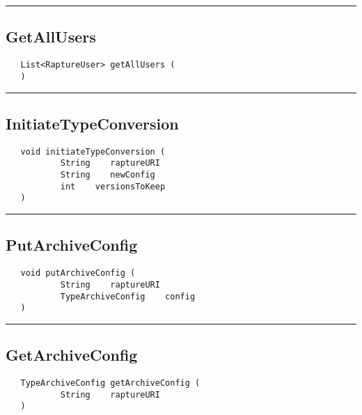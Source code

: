 \rule{15cm}{2pt}
\subsection{GetAllUsers}
\label{Api:GetAllUsers}
\begin{verbatim}
   List<RaptureUser> getAllUsers (
   )
\end{verbatim}



\rule{15cm}{2pt}
\subsection{InitiateTypeConversion}
\label{Api:InitiateTypeConversion}
\begin{verbatim}
   void initiateTypeConversion (
           String    raptureURI
           String    newConfig
           int    versionsToKeep
   )
\end{verbatim}



\rule{15cm}{2pt}
\subsection{PutArchiveConfig}
\label{Api:PutArchiveConfig}
\begin{verbatim}
   void putArchiveConfig (
           String    raptureURI
           TypeArchiveConfig    config
   )
\end{verbatim}



\rule{15cm}{2pt}
\subsection{GetArchiveConfig}
\label{Api:GetArchiveConfig}
\begin{verbatim}
   TypeArchiveConfig getArchiveConfig (
           String    raptureURI
   )
\end{verbatim}



